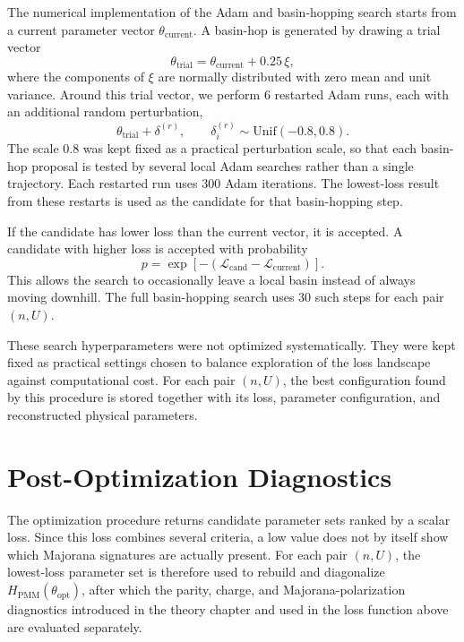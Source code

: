 The numerical implementation of the Adam and basin-hopping search starts from a current parameter vector $\theta_{\mathrm{current}}$. A basin-hop is generated by drawing a trial vector
\begin{equation}
\theta_{\mathrm{trial}}
=
\theta_{\mathrm{current}}+0.25\,\xi,
\end{equation}
where the components of $\xi$ are normally distributed with zero mean and unit variance. Around this trial vector, we perform $6$ restarted Adam runs, each with an additional random perturbation,
\begin{equation}
\theta_{\mathrm{trial}}+\delta^{(r)},
\qquad
\delta_i^{(r)}\sim \mathrm{Unif}(-0.8,0.8).
\end{equation}
The scale $0.8$ was kept fixed as a practical perturbation scale, so that each basin-hop proposal is tested by several local Adam searches rather than a single trajectory. Each restarted run uses $300$ Adam iterations. The lowest-loss result from these restarts is used as the candidate for that basin-hopping step.

If the candidate has lower loss than the current vector, it is accepted. A candidate with higher loss is accepted with probability
\begin{equation}
p
=
\exp\left[
-\left(
\mathcal{L}_{\mathrm{cand}}-\mathcal{L}_{\mathrm{current}}
\right)
\right].
\end{equation}
This allows the search to occasionally leave a local basin instead of always moving downhill. The full basin-hopping search uses $30$ such steps for each pair $(n,U)$.

These search hyperparameters were not optimized systematically. They were kept fixed as practical settings chosen to balance exploration of the loss landscape against computational cost. For each pair $(n,U)$, the best configuration found by this procedure is stored together with its loss, parameter configuration, and reconstructed physical parameters.


\section{Post-Optimization Diagnostics}
The optimization procedure returns candidate parameter sets ranked by a scalar loss. Since this loss combines several criteria, a low value does not by itself show which Majorana signatures are actually present. For each pair $(n,U)$, the lowest-loss parameter set is therefore used to rebuild and diagonalize $H_{\mathrm{PMM}}(\theta_{\mathrm{opt}})$, after which the parity, charge, and Majorana-polarization diagnostics introduced in the theory chapter and used in the loss function above are evaluated separately.

